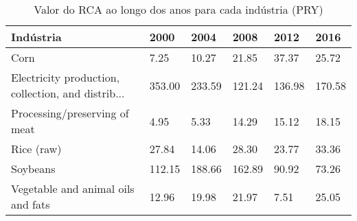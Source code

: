 \begin{table}
\centering
\caption{Valor do RCA ao longo dos anos para cada indústria (PRY)}
\begin{tabular}{p{6cm}p{1.5cm}p{1.5cm}p{1.5cm}p{1.5cm}p{1.5cm}}
\toprule
                                         Indústria &   2000 &   2004 &   2008 &   2012 &   2016 \\
\midrule
                                              Corn &   7.25 &  10.27 &  21.85 &  37.37 &  25.72 \\
Electricity production, collection, and distrib... & 353.00 & 233.59 & 121.24 & 136.98 & 170.58 \\
                     Processing/preserving of meat &   4.95 &   5.33 &  14.29 &  15.12 &  18.15 \\
                                        Rice (raw) &  27.84 &  14.06 &  28.30 &  23.77 &  33.36 \\
                                          Soybeans & 112.15 & 188.66 & 162.89 &  90.92 &  73.26 \\
                Vegetable and animal oils and fats &  12.96 &  19.98 &  21.97 &   7.51 &  25.05 \\
\bottomrule
\end{tabular}
\end{table}
